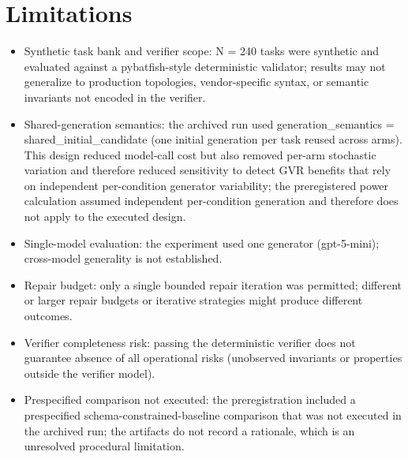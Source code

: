\documentclass[conference]{IEEEtran}
\begin{document}
\section{Limitations}
\begin{itemize}
\item Synthetic task bank and verifier scope: N = 240 tasks were synthetic and evaluated against a pybatfish-style deterministic validator; results may not generalize to production topologies, vendor-specific syntax, or semantic invariants not encoded in the verifier.
\item Shared-generation semantics: the archived run used generation\_semantics = shared\_initial\_candidate (one initial generation per task reused across arms). This design reduced model-call cost but also removed per-arm stochastic variation and therefore reduced sensitivity to detect GVR benefits that rely on independent per-condition generator variability; the preregistered power calculation assumed independent per-condition generation and therefore does not apply to the executed design.
\item Single-model evaluation: the experiment used one generator (gpt-5-mini); cross-model generality is not established.
\item Repair budget: only a single bounded repair iteration was permitted; different or larger repair budgets or iterative strategies might produce different outcomes.
\item Verifier completeness risk: passing the deterministic verifier does not guarantee absence of all operational risks (unobserved invariants or properties outside the verifier model).
\item Prespecified comparison not executed: the preregistration included a prespecified schema-constrained-baseline comparison that was not executed in the archived run; the artifacts do not record a rationale, which is an unresolved procedural limitation.
\end{itemize}
\end{document}
